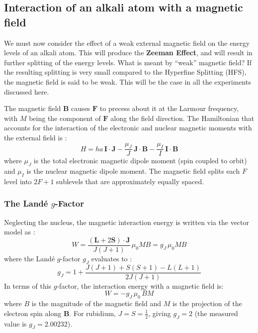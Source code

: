 \subsection{Interaction of an alkali atom with a magnetic field}
We must now consider the effect of a weak external magnetic field on the energy levels of an
alkali atom. This will produce the \textbf{Zeeman Effect}, and will result in further splitting
of the energy levels. What is meant by ``weak'' magnetic field? If the resulting splitting is
very small compared to the Hyperfine Splitting (HFS), the magnetic field is said to be weak.
This will be the case in all the experiments discussed here.
 
The magnetic field $\mathbf{B}$ causes $\mathbf{F}$ to precess about it at the Larmour
frequency, with $M$ being the component of $\mathbf{F}$ along the field direction.
The Hamiltonian that accounts for the interaction of the electronic and nuclear magnetic
moments with the external field is :
\begin{equation}
    H = ha\, \mathbf{I} \cdot \mathbf{J}
      - \frac{\mu_J}{J}\,\mathbf{J} \cdot \mathbf{B}
      - \frac{\mu_I}{I}\,\mathbf{I} \cdot \mathbf{B}
    \label{eq:hamiltonian_Bfield}
\end{equation}
where $\mu_J$ is the total electronic magnetic dipole moment (spin coupled to orbit) and
$\mu_I$ is the nuclear magnetic dipole moment. The magnetic field splits each $F$ level into
$2F + 1$ sublevels that are approximately equally spaced.
 
\subsubsection*{The Land\'{e} $g$-Factor}
 
Neglecting the nucleus, the magnetic interaction energy is written via the vector model as :
\begin{equation}
    W = \frac{(\mathbf{L} + 2\mathbf{S})\cdot\mathbf{J}}{J(J+1)}\,\mu_0 MB
      = g_J\,\mu_0 MB
    \label{eq:mag_energy}
\end{equation}
where the Land\'{e} $g$-factor $g_J$ evaluates to :
\begin{equation}
    g_J = 1 + \frac{J(J+1) + S(S+1) - L(L+1)}{2J(J+1)}
    \label{eq:gJ}
\end{equation}
In terms of this $g$-factor, the interaction energy with a magnetic field is:
\begin{equation}
    W = -g_J\,\mu_0\,BM
    \label{eq:W_electron}
\end{equation}
where $B$ is the magnitude of the magnetic field and $M$ is the projection of the electron
spin along $\mathbf{B}$. For rubidium, $J = S = \tfrac{1}{2}$, giving $g_J = 2$
(the measured value is $g_J = 2.00232$).
 
